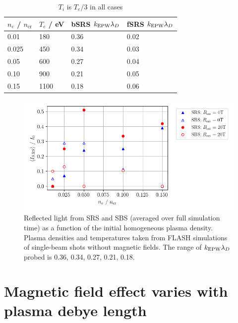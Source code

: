 \begin{table}[h]
\begin{center}

\begin{tabular}{|l|l|l|l|}
\hline
$n_e$ / $n_{\mathrm{cr}}$ & $T_e$ / eV & bSRS $k_\mathrm{EPW}\lambda_D$ & fSRS $k_\mathrm{EPW}\lambda_D$\\ \hline \hline
0.01 & 180 & 0.36 & 0.02 \\ \hline
0.025& 450 & 0.34 & 0.03 \\ \hline
0.05 & 600 & 0.27 & 0.04 \\ \hline
0.10 & 900 & 0.21 &  0.05\\ \hline
0.15 & 1100 & 0.18 & 0.06 \\ \hline

\end{tabular}

\end{center}
\caption{$T_i$ is $T_e/3$ in all cases}
\label{tab:LULI_setup}
\end{table}


\begin{figure}[ht]
   \centering
    \includegraphics[width=\columnwidth]{Chapters/C6_magSRS/LULI_sims_v3.png}
    \caption{Reflected light from SRS and SBS (averaged over full simulation time) as a function of the initial homogeneous plasma density. Plasma densities and temperatures taken from FLASH simulations of single-beam shots without magnetic fields. The range of $k_\mathrm{EPW}\lambda_D$ probed is 0.36, 0.34, 0.27, 0.21, 0.18.}
    \label{fig:LULI_sims_v3}
\end{figure}{}



\section{Magnetic field effect varies with plasma debye length}

